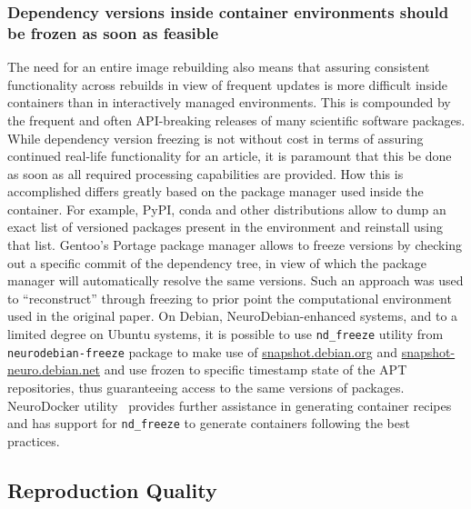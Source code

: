 \subsubsection{Dependency versions inside container environments should be frozen as soon as feasible}
The need for an entire image rebuilding also means that assuring consistent functionality across rebuilds in view of frequent updates is more difficult inside containers than in interactively managed environments.
This is compounded by the frequent and often API-breaking releases of many scientific software packages.
While dependency version freezing is not without cost in terms of assuring continued real-life functionality for an article, it is paramount that this be done as soon as all required processing capabilities are provided.
How this is accomplished differs greatly based on the package manager used inside the container.
For example, PyPI, conda and other distributions allow to dump an exact list of versioned packages present in the environment and reinstall using that list.
Gentoo's Portage package manager allows to freeze versions by checking out a specific commit of the dependency tree, in view of which the package manager will automatically resolve the same versions.
Such an approach was used to ``reconstruct'' through freezing to prior point the computational environment used in the original paper.
On Debian, NeuroDebian-enhanced systems, and to a limited degree on Ubuntu systems, it is possible to use \texttt{nd\_freeze} utility from \texttt{neurodebian-freeze} package to make use of \href{https://snapshot.debian.org}{snapshot.debian.org} and \href{http://snapshot-neuro.debian.net}{snapshot-neuro.debian.net} and use frozen to specific timestamp state of the APT repositories, thus guaranteeing access to the same versions of packages.
NeuroDocker utility~\cite{neurodocker} provides further assistance in generating container recipes and has support for \texttt{nd\_freeze} to generate containers following the best practices.


\subsection{Reproduction Quality}


